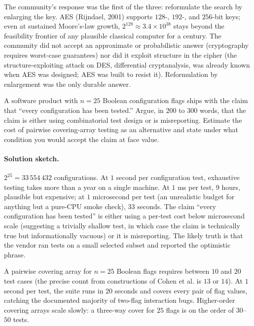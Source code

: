 The community's response was the first of the three: reformulate
the search by enlarging the key. AES (Rijndael, 2001) supports
$128$-, $192$-, and $256$-bit keys; even at sustained Moore's-law
growth, $2^{128} \approx 3.4 \times 10^{38}$ stays beyond the
feasibility frontier of any plausible classical computer for a
century. The community did not accept an approximate or
probabilistic answer (cryptography requires worst-case guarantees)
nor did it exploit structure in the cipher (the structure-exploiting
attack on DES, differential cryptanalysis, was already known when
AES was designed; AES was built to resist it). Reformulation by
enlargement was the only durable answer.

\begin{exercise}
A software product with $n = 25$ Boolean configuration flags ships
with the claim that ``every configuration has been tested.'' Argue,
in 200 to 300 words, that the claim is either using combinatorial
test design or is misreporting. Estimate the cost of pairwise
covering-array testing as an alternative and state under what
condition you would accept the claim at face value.
\end{exercise}

\paragraph{Solution sketch.}
$2^{25} = 33\,554\,432$ configurations. At $1$ second per
configuration test, exhaustive testing takes more than a year on a
single machine. At $1$ ms per test, $9$ hours, plausible but
expensive; at $1$ microsecond per test (an unrealistic budget for
anything but a pure-CPU smoke check), $33$ seconds. The claim
``every configuration has been tested'' is either using a per-test
cost below microsecond scale (suggesting a trivially shallow test,
in which case the claim is technically true but informationally
vacuous) or it is misreporting. The likely truth is that the
vendor ran tests on a small selected subset and reported the
optimistic phrase.

A pairwise covering array for $n = 25$ Boolean flags requires
between $10$ and $20$ test cases (the precise count from
constructions of Cohen et al. is $13$ or $14$). At $1$ second per
test, the suite runs in $20$ seconds and covers every pair of
flag values, catching the documented majority of two-flag
interaction bugs. Higher-order covering arrays scale slowly: a
three-way cover for $25$ flags is on the order of $30$--$50$ tests.

